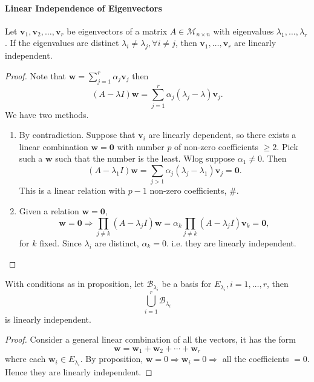 \documentclass[a4paper]{article}
\begin{document}
    \paragraph{Linear Independence of Eigenvectors}
    \begin{proposition}\label{prop:eigenvectors linearly independent}
      Let $ \mathbf{v}_1,\mathbf{v}_2,\dots, \mathbf{v}_r $ be
      eigenvectors of a matrix $A\in \mathcal{M}_{n\times n}$ with
      eigenvalues $ \lambda_1,\dots,\lambda_r $. If the eigenvalues
      are distinct $ \lambda_i\neq \lambda_j, \forall i\neq j $, then
      $ \mathbf{v}_1,\dots,\mathbf{v}_r $ are linearly independent.
    \end{proposition}
    \begin{proof}
      Note that $ \mathbf{w}=\sum_{j=1}^{r} \alpha_j \mathbf{v}_j $ then
      \[
        (A-\lambda I)\mathbf{w}=\sum_{j=1}^{r}
        \alpha_j(\lambda_j-\lambda)\mathbf{v}_j
      .\]
      We have two methods.
      \begin{enumerate}[align=left,label=Method \arabic*.]
        \item By contradiction. Suppose that $\mathbf{v}_i$ are
          linearly dependent, so there exists a linear combination $
          \mathbf{w}= \mathbf{0} $ with number $p$ of non-zero
          coefficients $ \ge 2 $. Pick such a $\mathbf{w}$ such that
          the number is the least. Wlog suppose $ \alpha_1 \neq 0$. Then
          \[
            (A-\lambda_1 I)\mathbf{w}=
            \sum_{j>1}\alpha_j(\lambda_j-\lambda_1 )\mathbf{v}_j=\mathbf{0}
          .\]
          This is a linear relation with $p-1$ non-zero coefficients, \#.
        \item Given a relation $ \mathbf{w}=\mathbf{0} $,
          \[
            \mathbf{w}=\mathbf{0} \Longrightarrow \prod_{j\neq
            k}(A-\lambda_j I)\mathbf{w}=\alpha_k\prod_{j\neq
            k}(A-\lambda_j I) \mathbf{v}_k=\mathbf{0}
          ,\]
          for $k$ fixed. Since $ \lambda_i $ are distinct, $
          \alpha_k=0 $. i.e. they are linearly independent.
      \end{enumerate}
    \end{proof}
    \begin{corollary}\label{col:basis of all eigenvectors}
      With conditions as in proposition, let $
      \mathcal{B}_{\lambda_i} $ be a basis for $
      E_{\lambda_i},i=1,\dots,r $, then
      \[
        \bigcup_{i=1}^{r} \mathcal{B}_{\lambda_i}
      \]
      is linearly independent.
    \end{corollary}
    \begin{proof}
      Consider a general linear combination of all the vectors, it has the form
      \[
        \mathbf{w}=\mathbf{w}_1+\mathbf{w}_2+ \cdots +\mathbf{w}_r
      \]
      where each $\mathbf{w}_i\in E_{\lambda_i}$. By proposition, $
      \mathbf{w}=0 \Rightarrow \mathbf{w}_i=0 \Rightarrow  $ all the
      coefficients $=0$. Hence they are linearly independent.
    \end{proof}
\end{document}
